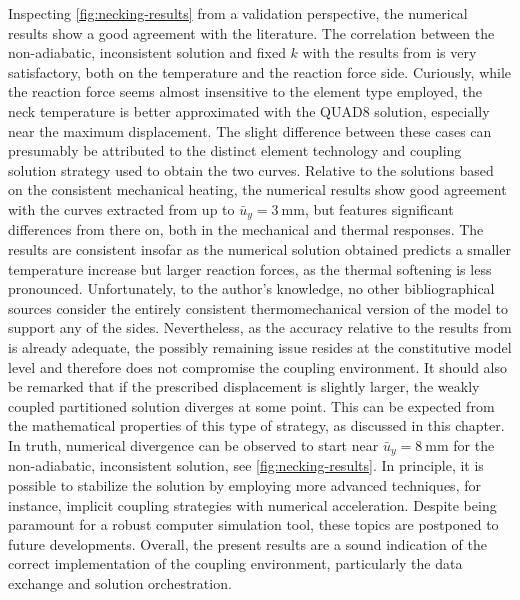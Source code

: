 Inspecting \ref{fig:necking-results} from a validation perspective, the numerical results show a good agreement with the literature.
The correlation between the non-adiabatic, inconsistent solution and fixed $k$ with the results from \cite{simo_associative_1992} is very satisfactory, both on the temperature and the reaction force side.
Curiously, while the reaction force seems almost insensitive to the element type employed, the neck temperature is better approximated with the QUAD8 solution, especially near the maximum displacement.
The slight difference between these cases can presumably be attributed to the distinct element technology and coupling solution strategy used to obtain the two curves.
Relative to the solutions based on the consistent mechanical heating, the numerical results show good agreement with the curves extracted from \cite{danowski_computational_2014} up to $\bar{u}_{y}=\SI{3}{\milli\meter}$, but features significant differences from there on, both in the mechanical and thermal responses.
The results are consistent insofar as the numerical solution obtained predicts a smaller temperature increase but larger reaction forces, as the thermal softening is less pronounced.
Unfortunately, to the author's knowledge, no other bibliographical sources consider the entirely consistent thermomechanical version of the model to support any of the sides.
Nevertheless, as the accuracy relative to the results from \cite{simo_associative_1992} is already adequate, the possibly remaining issue resides at the constitutive model level and therefore does not compromise the coupling environment.
It should also be remarked that if the prescribed displacement is slightly larger, the weakly coupled partitioned solution diverges at some point.
This can be expected from the mathematical properties of this type of strategy, as discussed in this chapter.
In truth, numerical divergence can be observed to start near $\bar{u}_{y}=\SI{8}{\milli\meter}$ for the non-adiabatic, inconsistent solution, see \ref{fig:necking-results}.
In principle, it is possible to stabilize the solution by employing more advanced techniques, for instance, implicit coupling strategies with numerical acceleration.
Despite being paramount for a robust computer simulation tool, these topics are postponed to future developments.
Overall, the present results are a sound indication of the correct implementation of the coupling environment, particularly the data exchange and solution orchestration.
\begin{figure}
\end{figure}

